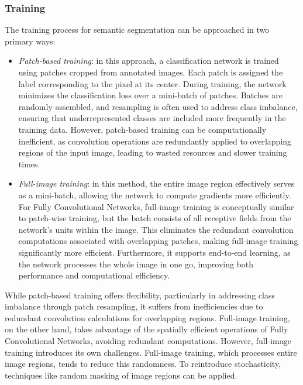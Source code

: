 \subsubsection{Training}
The training process for semantic segmentation can be approached in two primary ways:
\begin{itemize}
    \item \textit{Patch-based training}: in this approach, a classification network is trained using patches cropped from annotated images. 
        Each patch is assigned the label corresponding to the pixel at its center. During training, the network minimizes the classification loss over a mini-batch of patches. 
        Batches are randomly assembled, and resampling is often used to address class imbalance, ensuring that underrepresented classes are included more frequently in the training data. 
        However, patch-based training can be computationally inefficient, as convolution operations are redundantly applied to overlapping regions of the input image, leading to wasted resources and slower training times.
        \item \textit{Full-image training}: in this method, the entire image region effectively serves as a mini-batch, allowing the network to compute gradients more efficiently. 
            For Fully Convolutional Networks, full-image training is conceptually similar to patch-wise training, but the batch consists of all receptive fields from the network's units within the image. 
            This eliminates the redundant convolution computations associated with overlapping patches, making full-image training significantly more efficient. 
            Furthermore, it supports end-to-end learning, as the network processes the whole image in one go, improving both performance and computational efficiency.

\end{itemize}
While patch-based training offers flexibility, particularly in addressing class imbalance through patch resampling, it suffers from inefficiencies due to redundant convolution calculations for overlapping regions.
Full-image training, on the other hand, takes advantage of the spatially efficient operations of Fully Convolutional Networks, avoiding redundant computations. 
However, full-image training introduces its own challenges. 
Full-image training, which processes entire image regions, tends to reduce this randomness. 
To reintroduce stochasticity, techniques like random masking of image regions can be applied.

